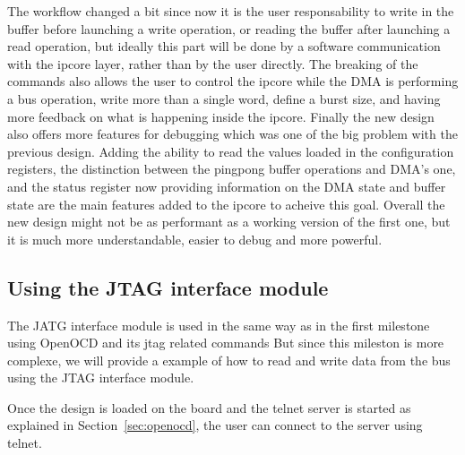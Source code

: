 \documentclass[a4paper,11pt,oneside]{report}
\begin{document}
The workflow changed a bit since now it is the user responsability to write in the buffer before launching a write operation, or reading the buffer after launching a read operation, but ideally this part will be done by a software communication with the ipcore layer, 
rather than by the user directly.
The breaking of the commands also allows the user to control the ipcore while the DMA is performing a bus operation, write more than a single word, define a burst size, and having more feedback on what is happening inside the ipcore.
Finally the new design also offers more features for debugging which was one of the big problem with the previous design. Adding the ability to read the values loaded in the configuration registers, 
the distinction between the pingpong buffer operations and DMA's one, and the status register now providing information on the DMA state and buffer state are the main features added to the ipcore to acheive this goal.
Overall the new design might not be as performant as a working version of the first one, but it is much more understandable, easier to debug and more powerful.

\subsection{Using the JTAG interface module}

The JATG interface module is used in the same way as in the first milestone using OpenOCD and its jtag related commands
But since this mileston is more complexe, we will provide a example of how to read and write data from the bus using the JTAG interface module.

Once the design is loaded on the board and the telnet server is started as explained in Section~\ref{sec:openocd}, the user can connect to the server using telnet.
\end{document}
